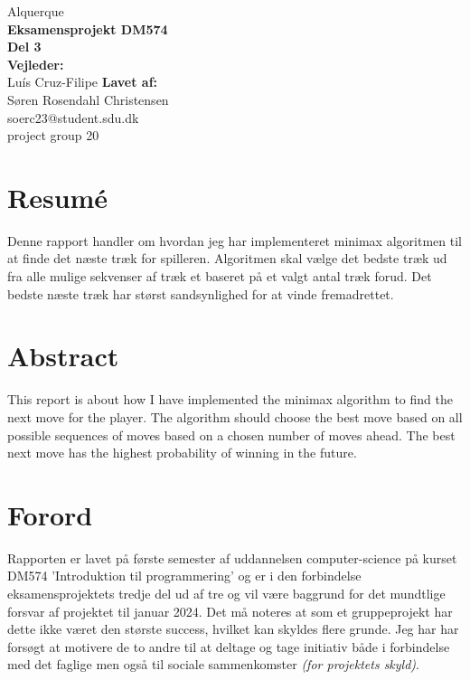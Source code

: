 \documentclass{article}
\begin{document}
\begin{titlepage}
    \vfill
    \clearpage\thispagestyle{empty}
    \centering
    {\Large Alquerque}\vspace{0.5cm}\\
    {\bfseries Eksamensprojekt DM574\\
    Del 3}\\
    \vfill
    {\bfseries Vejleder:}\\
    {Luís Cruz-Filipe}
    \vfill
    {\bfseries Lavet af:}\\
    {Søren Rosendahl Christensen\\
    soerc23@student.sdu.dk\\
    project group 20}
    \vskip6cm
\end{titlepage}

\section*{Resumé}
Denne rapport handler om hvordan jeg har implementeret minimax algoritmen til at finde det
næste træk for spilleren. Algoritmen skal vælge det bedste træk ud fra alle mulige 
sekvenser af træk et baseret på et valgt antal træk forud. Det bedste næste træk 
har størst sandsynlighed for at vinde fremadrettet.

\section*{Abstract}
This report is about how I have implemented the minimax algorithm to find the 
next move for the player. The algorithm should choose the best move based on all possible 
sequences of moves based on a chosen number of moves ahead. The best next move 
has the highest probability of winning in the future.

\newpage
\section*{Forord}
Rapporten er lavet på første semester af uddannelsen computer-science på kurset DM574
'Introduktion til programmering' og er i den forbindelse eksamensprojektets 
tredje del ud af tre og vil være baggrund for det mundtlige forsvar af projektet til januar 2024.
\bigbreak
Det må noteres at som et gruppeprojekt har dette ikke været den største success, hvilket kan
skyldes flere grunde. Jeg har har forsøgt at motivere de to andre til at
deltage og tage initiativ både i forbindelse med det faglige men også til sociale sammenkomster \textit{(for projektets skyld)}.
\clearpage
\tableofcontents
\end{document}
